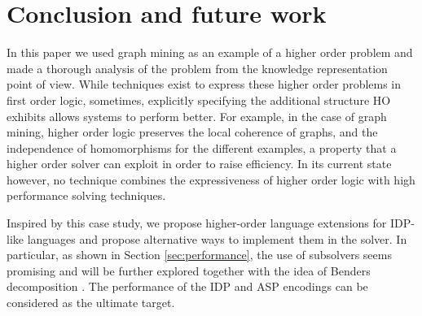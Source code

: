 \section{Conclusion and future work}
\label{sec:conclusion}
\vspace{-0.5em}
In this paper we used graph mining as an example of a higher order problem and made a thorough analysis of the problem from the knowledge representation point of view. While techniques exist to express these higher order problems in first order logic, sometimes, explicitly specifying the additional structure HO exhibits allows systems to perform better. For example, in the case of graph mining, higher order logic preserves the local coherence of graphs, and the independence of homomorphisms for the different examples, a property that a higher order solver can exploit in order to raise efficiency. In its current state however, no technique combines the expressiveness of higher order logic with high performance solving techniques. 

Inspired by this case study, we propose higher-order language extensions for IDP-like languages and propose alternative ways to implement them in the solver. In particular, as shown in Section \ref{sec:performance}, the use of subsolvers seems promising and will be further explored together with the idea of Benders decomposition \citep{Benders}. The performance of the IDP and ASP encodings can be considered as the ultimate target. 
\vspace{-0.5em}